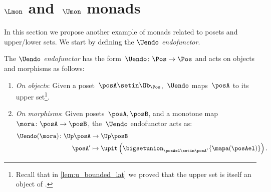 %

\section{$\Lmon$ and~$\Umon$ monads}
In this section we propose another example of monads related to posets and upper/lower sets.
We start by defining the \emph{$\Uendo$ endofunctor}.
\begin{definition}
    \label{def:Uendo}
    The \emph{$\Uendo$ endofunctor} has the form~$\Uendo \colon \Pos \to \Pos$ and acts on objects and morphisms as follows:
    \begin{enumerate}
        \item \emph{On objects}: Given a poset~$\posA \setin \Ob_\Pos$,~$\Uendo$ maps~$\posA$ to its upper set\footnote{Recall that in \cref{lem:u_bounded_lat} we proved that the upper set is itself an object of \Pos.
              }.
        \item \emph{On morphisms}: Given posets~$\posA,\posB$, and a monotone map~$\mora \colon \posA\to \posB$, the~$\Uendo$ endofunctor acts as:
              \begin{equation}
                  \begin{aligned}
                      \Uendo(\mora)\colon \Up \posA & \to \Up \posB \\
                      \posA'                        & \mapsto \upit \left( \bigsetunion_{\posAel\setin \posA'} \{\mapa(\posAel)\}\right).
                  \end{aligned}
              \end{equation}
    \end{enumerate}
\end{definition}

